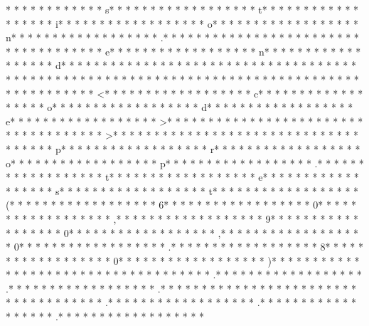 * * *  *  * * *  *  * * *  * s* * *  * * *  * * *  *  * * *  *  * * *  * t* * *  * * *  * * *  *  * * *  *  * * *  * i* * *  * * *  * * *  *  * * *  *  * * *  * o* * *  * * *  * * *  *  * * *  *  * * *  * n* * *  * * *  * * *  *  * * *  *  * * *  * .* * *  * * *  * * *  *  * * *  *  * * *  * 
* * *  * * *  * * *  *  * * *  *  * * *  * e* * *  * * *  * * *  *  * * *  *  * * *  * n* * *  * * *  * * *  *  * * *  *  * * *  * d* * *  * * *  * * *  *  * * *  *  * * *  * {* * *  * * *  * * *  *  * * *  *  * * *  *  * * *  * * *  * * *  *  * * *  *  * * *  * }* * *  * * *  * * *  *  * * *  *  * * *  * 
* * *  * * *  * * *  *  * * *  *  * * *  * <* * *  * * *  * * *  *  * * *  *  * * *  * c* * *  * * *  * * *  *  * * *  *  * * *  * o* * *  * * *  * * *  *  * * *  *  * * *  * d* * *  * * *  * * *  *  * * *  *  * * *  * e* * *  * * *  * * *  *  * * *  *  * * *  * >* * *  * * *  * * *  *  * * *  *  * * *  * 
* * *  * * *  * * *  *  * * *  *  * * *  * >* * *  * * *  * * *  *  * * *  *  * * *  *  * * *  * * *  * * *  *  * * *  *  * * *  * p* * *  * * *  * * *  *  * * *  *  * * *  * r* * *  * * *  * * *  *  * * *  *  * * *  * o* * *  * * *  * * *  *  * * *  *  * * *  * p* * *  * * *  * * *  *  * * *  *  * * *  * .* * *  * * *  * * *  *  * * *  *  * * *  * t* * *  * * *  * * *  *  * * *  *  * * *  * e* * *  * * *  * * *  *  * * *  *  * * *  * s* * *  * * *  * * *  *  * * *  *  * * *  * t* * *  * * *  * * *  *  * * *  *  * * *  * (* * *  * * *  * * *  *  * * *  *  * * *  * 6* * *  * * *  * * *  *  * * *  *  * * *  * 0* * *  * * *  * * *  *  * * *  *  * * *  * ,* * *  * * *  * * *  *  * * *  *  * * *  * 9* * *  * * *  * * *  *  * * *  *  * * *  * 0* * *  * * *  * * *  *  * * *  *  * * *  * ,* * *  * * *  * * *  *  * * *  *  * * *  * 0* * *  * * *  * * *  *  * * *  *  * * *  * .* * *  * * *  * * *  *  * * *  *  * * *  * 8* * *  * * *  * * *  *  * * *  *  * * *  * 0* * *  * * *  * * *  *  * * *  *  * * *  * )* * *  * * *  * * *  *  * * *  *  * * *  * 
* * *  * * *  * * *  *  * * *  *  * * *  * .* * *  * * *  * * *  *  * * *  *  * * *  * .* * *  * * *  * * *  *  * * *  *  * * *  * .* * *  * * *  * * *  *  * * *  *  * * *  * 
* * *  * * *  * * *  *  * * *  *  * * *  * .* * *  * * *  * * *  *  * * *  *  * * *  * .* * *  * * *  * * *  *  * * *  *  * * *  * .* * *  * * *  * * *  *  * * *  *  * * *  * 
